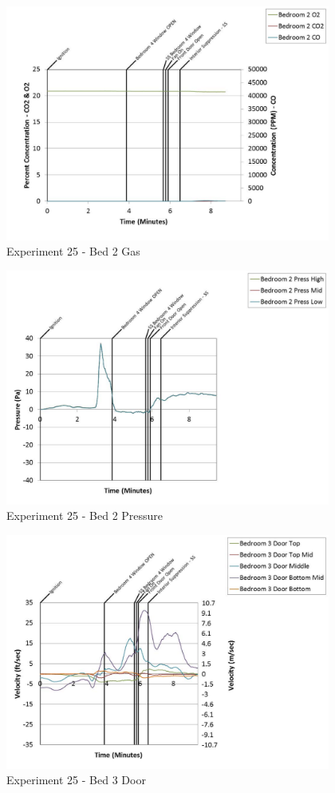 \documentclass{article}
\begin{document}
\begin{appendices}
	\begin{figure}[h!]
		\centering
		\includegraphics[height=3.05in]{0_Images/Results_Charts/Exp_25_Charts/Bed2Gas.pdf}
		\caption{Experiment 25 - Bed 2 Gas}
	\end{figure}
 
	\clearpage

	\begin{figure}[h!]
		\centering
		\includegraphics[height=3.05in]{0_Images/Results_Charts/Exp_25_Charts/Bed2Pressure.pdf}
		\caption{Experiment 25 - Bed 2 Pressure}
	\end{figure}
 

	\begin{figure}[h!]
		\centering
		\includegraphics[height=3.05in]{0_Images/Results_Charts/Exp_25_Charts/Bed3Door.pdf}
		\caption{Experiment 25 - Bed 3 Door}
	\end{figure}
 

\end{appendices}
\end{document}
